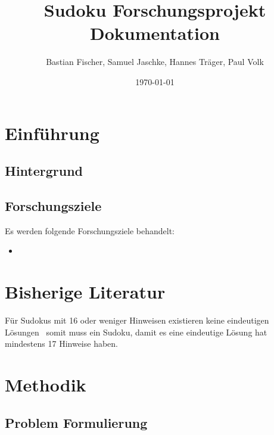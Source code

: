 \documentclass[12pt,a4paper]{article}
\title{Sudoku Forschungsprojekt Dokumentation}
\author{Bastian Fischer, Samuel Jaschke, Hannes Träger, Paul Volk}
\date{\today}
\begin{document}
\maketitle

\begin{abstract}
\end{abstract}

\section{Einführung}
\subsection{Hintergrund}

\subsection{Forschungsziele}
Es werden folgende Forschungsziele behandelt:
\begin{itemize}
    \item  
\end{itemize}

\section{Bisherige Literatur}
Für Sudokus mit 16 oder weniger Hinweisen existieren keine eindeutigen Lösungen~\cite{DBLP:journals/corr/abs-1201-0749} somit muss ein Sudoku, damit es eine eindeutige Lösung hat mindestens 17 Hinweise haben.
\section{Methodik}

\subsection{Problem Formulierung}
\end{document}

